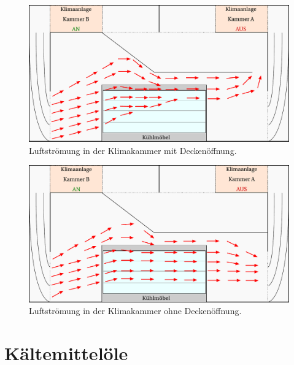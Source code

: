 \begin{figure}[h!tb]
\centering
\includegraphics[scale=.6]{Pictures/ClimateChamber_flow30pctOC.pdf}
\caption{Luftströmung in der Klimakammer mit Deckenöffnung.}
\label{fig:Klimakammer_offeneDecke}
\end{figure}

\begin{figure}[h!tb]
\centering
\includegraphics[scale=.6]{Pictures/ClimateChamber_flow30pctCC.pdf}
\caption{Luftströmung in der Klimakammer ohne Deckenöffnung.}
\label{fig:Klimakammer_geschlosseneDecke}
\end{figure}





\clearpage









\section{Kältemittelöle}
\label{sec:EinflussÖl}

